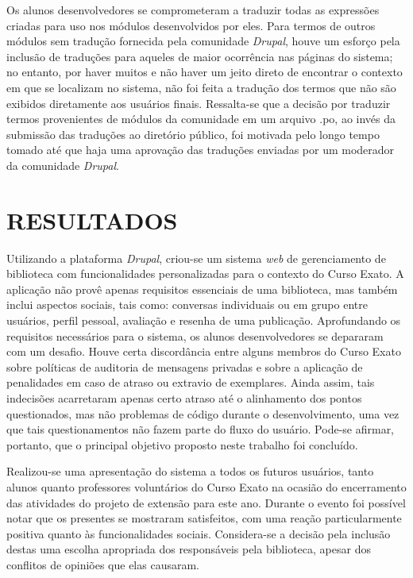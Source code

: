 \documentclass[a4paper]{article}
\begin{document}
Os alunos desenvolvedores se comprometeram a traduzir todas as expressões criadas para uso nos módulos desenvolvidos por eles. Para termos de outros módulos sem tradução fornecida pela comunidade \textit{Drupal}, houve um esforço pela inclusão de traduções para aqueles de maior ocorrência nas páginas do sistema; no entanto, por haver muitos e não haver um jeito direto de encontrar o contexto em que se localizam no sistema, não foi feita a tradução dos termos que não são exibidos diretamente aos usuários finais. Ressalta-se que a decisão por traduzir termos provenientes de módulos da comunidade em um arquivo .po, ao invés da submissão das traduções ao diretório público, foi motivada pelo longo tempo tomado até que haja uma aprovação das traduções enviadas por um moderador da comunidade \textit{Drupal}.

\pagebreak
\section{RESULTADOS} \label{sssec:improvements}
Utilizando a plataforma \textit{Drupal}, criou-se um sistema \textit{web} de gerenciamento de biblioteca com funcionalidades personalizadas para o contexto do Curso Exato. A aplicação não provê apenas requisitos essenciais de uma biblioteca, mas também inclui aspectos sociais, tais como: conversas individuais ou em grupo entre usuários, perfil pessoal, avaliação e resenha de uma publicação. Aprofundando os requisitos necessários para o sistema, os alunos desenvolvedores se depararam com um desafio. Houve certa discordância entre alguns membros do Curso Exato sobre políticas de auditoria de mensagens privadas e sobre a aplicação de penalidades em caso de atraso ou extravio de exemplares. Ainda assim, tais indecisões acarretaram apenas certo atraso até o alinhamento dos pontos questionados, mas não problemas de código durante o desenvolvimento, uma vez que tais questionamentos não fazem parte do fluxo do usuário. Pode-se afirmar, portanto, que o principal objetivo proposto neste trabalho foi concluído. 

Realizou-se uma apresentação do sistema a todos os futuros usuários, tanto alunos quanto professores voluntários do Curso Exato na ocasião do encerramento das atividades do projeto de extensão para este ano. Durante o evento foi possível notar que os presentes se mostraram satisfeitos, com uma reação particularmente positiva quanto às funcionalidades sociais. Considera-se a decisão pela inclusão destas uma escolha apropriada dos responsáveis pela biblioteca, apesar dos conflitos de opiniões que elas causaram.
\end{document}
